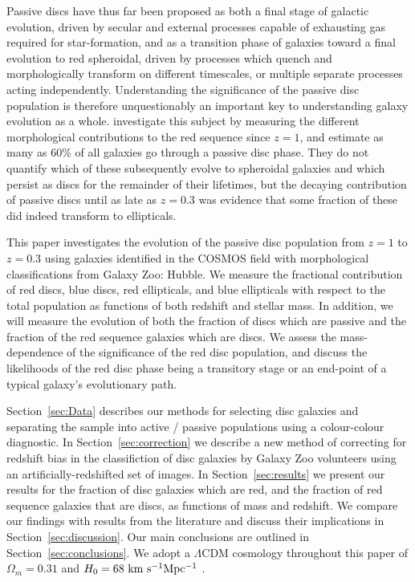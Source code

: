 \documentclass[useAMS,usenatbib]{mn2e}
\begin{document}
Passive discs have thus far been proposed as both a final stage of galactic evolution, driven by secular and external processes capable of exhausting gas required for star-formation, and as a transition phase of galaxies toward a final evolution to red spheroidal, driven by processes which quench and morphologically transform on different timescales, or multiple separate processes acting independently. Understanding the significance of the passive disc population is therefore unquestionably an important key to understanding galaxy evolution as a whole. \citet{Bundy2010} investigate this subject by measuring the different morphological contributions to the red sequence since $z=1$, and estimate as many as 60\% of all galaxies go through a passive disc phase. They do not quantify which of these subsequently evolve to spheroidal galaxies and which persist as discs for the remainder of their lifetimes, but the decaying contribution of passive discs until as late as $z=0.3$ was evidence that some fraction of these did indeed transform to ellipticals.

This paper investigates the evolution of the passive disc population from $z=1$ to $z=0.3$ using galaxies identified in the COSMOS field with morphological classifications from Galaxy Zoo: Hubble. We measure the fractional contribution of red discs, blue discs, red ellipticals, and blue ellipticals with respect to the total population as functions of both redshift and stellar mass. In addition, we will measure the evolution of both the fraction of discs which are passive and the fraction of the red sequence galaxies which are discs. We assess the mass-dependence of the significance of the red disc population, and discuss the likelihoods of the red disc phase being a transitory stage or an end-point of a typical galaxy's evolutionary path.

Section~\ref{sec:Data} describes our methods for selecting disc galaxies and separating the sample into active / passive populations using a colour-colour diagnostic. In Section~\ref{sec:correction} we describe a new method of correcting for redshift bias in the classifiction of disc galaxies by Galaxy Zoo volunteers using an artificially-redshifted set of images. In Section~\ref{sec:results} we present our results for the fraction of disc galaxies which are red, and the fraction of red sequence galaxies that are discs, as functions of mass and redshift. We compare our findings with results from the literature and discuss their implications in Section~\ref{sec:discussion}. Our main conclusions are outlined in Section~\ref{sec:conclusions}. We adopt a $\Lambda$CDM cosmology throughout this paper of $\Omega_m=0.31$ and $H_0=68~\rm km~s^{-1} Mpc^{-1}$ \citep{PlanckCollaboration2015}.
\end{document}
